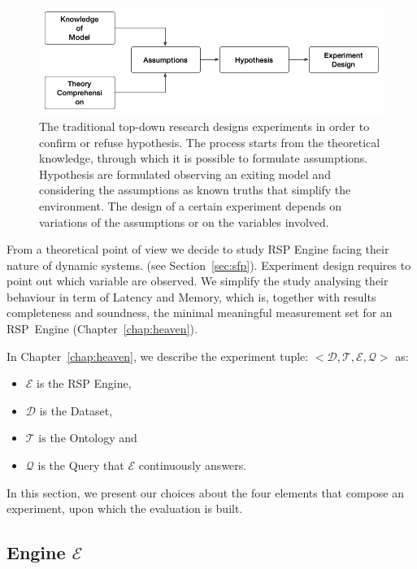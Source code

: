 \begin{figure}[tbh]
  \centering
	\includegraphics[width=\linewidth]{images/experiment-design}
	\caption[Experiment Design Process]{The traditional top-down research designs experiments in order to confirm or refuse hypothesis. The process starts from the theoretical knowledge, through which it is possible to formulate assumptions. Hypothesis are formulated observing an exiting model and considering the assumptions as known truths that simplify the environment. The design of a certain experiment depends on variations of the assumptions or on the variables involved.}
  	\label{fig:experiment-design}
\end{figure}

From a theoretical point of view we decide to study RSP Engine facing their nature of dynamic systems. (see Section~\ref{sec:sfp}). Experiment design requires to point out which variable are observed. We simplify the study analysing their behaviour in term of Latency and Memory, which is, together with results completeness and soundness, the minimal meaningful measurement set for an RSP~Engine (Chapter~\ref{chap:heaven}).

In Chapter~\ref{chap:heaven}, we describe the experiment tuple: $<\mathcal{D}, \mathcal{T},\mathcal{E}, \mathcal{Q}>$ as:
\begin{itemize}
\item $\mathcal{E}$ is the RSP Engine,
\item $\mathcal{D}$ is the Dataset,
\item $\mathcal{T}$ is the Ontology and
\item $\mathcal{Q}$ is the Query that $\mathcal{E}$ continuously answers.
\end{itemize}

In this section, we present our choices about the four elements that compose an experiment, upon which the evaluation is built.

\pagebreak

\subsection{Engine $\mathcal{E}$}


